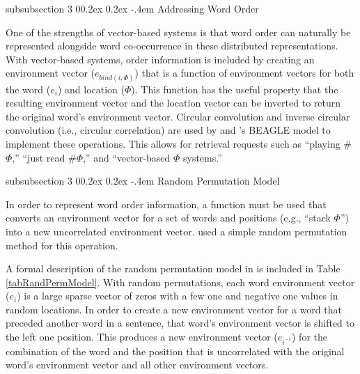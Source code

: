 \documentclass[man,donotrepeattitle]{apa6}
\makeatletter
\renewcommand{\subsubsection}{%
  \@startsection
  {subsubsection}%
  {3}%
  {\parindent}%
  {0\baselineskip \@plus 0.2ex \@minus 0.2ex}%
  {-.4em}%
  {\normalfont\normalsize\bfseries\addperi}}
\makeatother
\begin{document}
\subsubsection{Addressing Word Order}

One of the strengths of vector-based systems is that word order can naturally be represented alongside word co-occurrence in these distributed representations.
With vector-based systems, order information is included by creating an environment vector ($e_{bind(i,\Phi)}$) that is a function of environment vectors for both the word ($e_{i}$) and location ($\Phi$).
This function has the useful property that the resulting environment vector and the location vector can be inverted to return the original word's environment vector.
Circular convolution and inverse circular convolution (i.e., circular correlation) are used by \textcite{Plate1995} and \textcite{Jones2007}'s BEAGLE model to implement these operations.
This allows for retrieval requests such as ``playing \#$\Phi$,'' ``just read \#$\Phi$,'' and ``vector-based $\Phi$ systems.''

\subsubsection{Random Permutation Model}

In order to represent word order information, a function must be used that converts an environment vector for a set of words and positions (e.g., ``stack $\Phi$'') into a new uncorrelated environment vector.
\textcite{Sahlgren2008} used a simple random permutation method for this operation.

A formal description of the random permutation model in \textcite{Sahlgren2008} is included in Table \ref{tabRandPermModel}.
With random permutations, each word environment vector ($e_{i}$) is a large sparse vector of zeros with a few one and negative one values in random locations. 
In order to create a new environment vector for a word that preceded another word in a sentence, that word's environment vector is shifted to the left one position.
This produces a new environment vector ($e_{i^{-1}}$) for the combination of the word and the position that is uncorrelated with the original word's environment vector and all other environment vectors.
\end{document}
